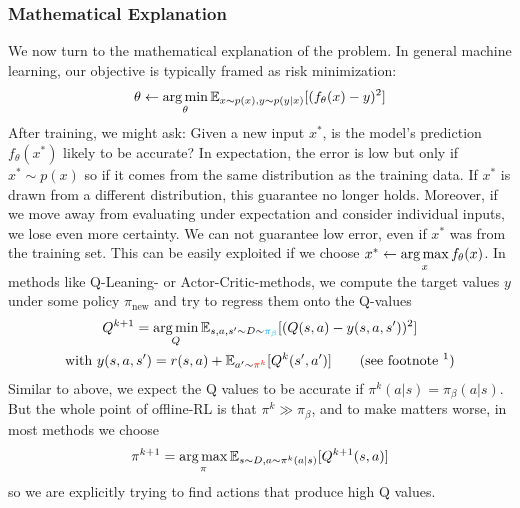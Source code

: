 \subsubsection{Mathematical Explanation}
We now turn to the mathematical explanation of the problem. In general machine learning, our objective is 
typically framed as risk minimization:
 $$\theta \gets \operatorname*{arg\,min}\limits_\theta \mathbb{E}_{x\sim p(x),y \sim p(y|x)}[(f_\theta(x)-y)^2]$$
After training, we might ask: Given a new input $x^*$, is the model's prediction $f_\theta(x^*)$ likely to be accurate?
In expectation, the error is low but only if $x^* \sim p(x)$  so if it comes from the same distribution as the training data. 
If $x^*$ is drawn from a different distribution, this guarantee no longer holds.\newline 
Moreover, if we move away from evaluating under expectation and consider individual inputs, we lose even more certainty. We 
can not guarantee low error, even if $x^*$ was from the training set. This can be easily exploited if we choose 
$x^* \gets \operatorname*{arg\,max}\limits_x f_\theta(x)$.\newline 
In methods like Q-Leaning- or Actor-Critic-methods, we compute the target values $y$ under some policy $\pi_\text{new}$ and try to regress them onto the Q-values
\begin{gather*}
    Q^{k+1}= \argmin\limits_Q \mathbb{E}_{s,a,s' \sim D \sim {\color{cyan}\pi_\beta}}[(Q(s,a)-y(s,a,s'))^2] \\
    \text{with }y(s,a,s') = r(s,a)+\mathbb{E}_{a' \sim {\color{red}\pi^k}}[Q^k(s',a')] \qquad (\text{see footnote \footnotemark})
\end{gather*}
Similar to above, we expect the Q values to be accurate if $\pi^k(a|s) = \pi_\beta(a|s)$. But the whole point of offline-RL is that $\pi^k \gg \pi_\beta$, and to make matters worse, in most methods we choose 
 $$\pi^{k+1} = \operatorname*{arg\,max}\limits_\pi \mathbb{E}_{s\sim D,a\sim \pi^k(a|s)}[Q^{k+1}(s,a)]$$ so we are explicitly trying to find actions that produce high Q values.



